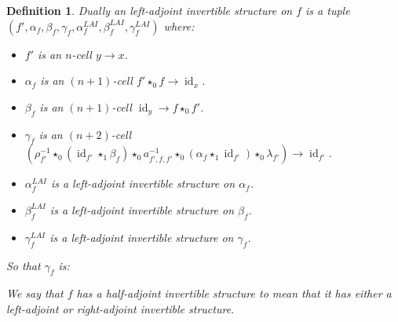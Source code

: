 \documentclass[draft]{article}
\newtheorem{definition}[theorem]{Definition} \theoremstyle{remark}
\DeclareMathOperator{\id}{id}
\newcommand{\inv}[1]{#1^{-1}} \newcommand{\comp}{\star}
\begin{document}
\begin{definition}
  Dually an \emph{left-adjoint invertible} structure on \(f\) is a
  tuple \((f', \alpha_f, \beta_f, \gamma_f, \alpha_f^{LAI},
  \beta_f^{LAI}, \gamma_f^{LAI})\) where:
  \begin{itemize}
  \item \(f'\) is an \(n\)-cell \(y \to x\).
  \item \(\alpha_f\) is an \((n+1)\)-cell \(f' \comp_0 f \to \id_x\).
  \item \(\beta_f\) is an \((n+1)\)-cell \(\id_y \to f \comp_0 f'\).
  \item \(\gamma_f\) is an \((n+2)\)-cell \((\rho_{f'}^{-1} \comp_0
    (\id_{f'} \comp_1 \beta_f) \comp_0 \inv {a_{f',f,f'}} \comp_0
    (\alpha_f \comp_1 \id_{f'}) \comp_0 \lambda_{f'}) \to \id_{f'}\).
  \item \(\alpha_f^{LAI}\) is a left-adjoint invertible structure on
    \(\alpha_f\).
  \item \(\beta_f^{LAI}\) is a left-adjoint invertible structure on
    \(\beta_f\).
  \item \(\gamma_f^{LAI}\) is a left-adjoint invertible structure on
    \(\gamma_f\).
  \end{itemize}

  So that \(\gamma_f\) is:
  \begin{center}
  \end{center}

  We say that \(f\) has a \emph{half-adjoint invertible} structure to
  mean that it has either a left-adjoint or right-adjoint invertible
  structure.
\end{definition}
\end{document}
